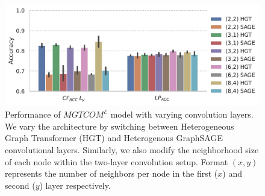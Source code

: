 \begin{figure}[]
\centering

\includegraphics[width=0.6\columnwidth]{resources/figs/tune_topo_neigh.pdf}

\caption{
Performance of $MGTCOM^{\mathcal{E}}$ model with varying convolution layers. 
We vary the architecture by switching between Heterogeneous Graph Transformer (HGT) and Heterogenous GraphSAGE convolutional layers.
Similarly, we also modify the neighborhood size of each node within the two-layer convolution setup. 
Format $(x, y)$ represents the number of neighbors per node in the first ($x$) and second ($y$) layer respectively.
}
\label{fig:hyp_neigh}
\end{figure}